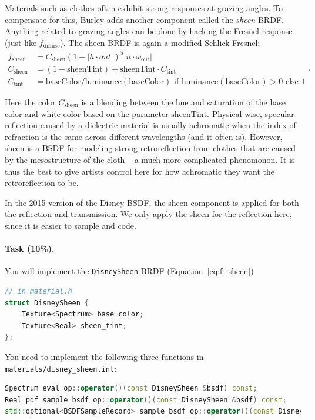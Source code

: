 Materials such as clothes often exhibit strong responses at grazing angles. To compensate for this, Burley adds another component called the \emph{sheen} BRDF. Anything related to grazing angles can be done by hacking the Fresnel response (just like $f_{\text{diffuse}}$). The sheen BRDF is again a modified Schlick Fresnel:
\begin{equation}
\begin{aligned}
f_{\text{sheen}} &= C_{\text{sheen}} (1 - |h \cdot out|)^5 |n \cdot \omega_{\text{out}}| \\
C_{\text{sheen}} &= \left(1 - \text{sheenTint}\right) + \text{sheenTint} \cdot C_{\text{tint}} \\
C_{\text{tint}} &= \text{baseColor} / \text{luminance}(\text{baseColor}) \text{ if } \text{luminance}(\text{baseColor}) > 0 \text{ else } 1
\end{aligned}.
\label{eq:f_sheen}
\end{equation}

Here the color $C_{\text{sheen}}$ is a blending between the hue and saturation of the base color and white color based on the parameter $\text{sheenTint}$. Physical-wise, specular reflection caused by a dielectric material is usually achromatic when the index of refraction is the same across different wavelengths (and it often is). However, sheen is a BSDF for modeling strong retroreflection from clothes that are caused by the mesostructure of the cloth -- a much more complicated phenomonon. It is thus the best to give artists control here for how achromatic they want the retroreflection to be.

In the 2015 version of the Disney BSDF, the sheen component is applied for both the reflection and transmission. We only apply the sheen for the reflection here, since it is easier to sample and code.

\paragraph{Task (10\%).} You will implement the \lstinline{DisneySheen} BRDF (Equation~\ref{eq:f_sheen})
\begin{lstlisting}[language=c++]
// in material.h
struct DisneySheen {
    Texture<Spectrum> base_color;
    Texture<Real> sheen_tint;
};
\end{lstlisting}

You need to implement the following three functions in \lstinline{materials/disney_sheen.inl}:
\begin{lstlisting}[language=c++]
Spectrum eval_op::operator()(const DisneySheen &bsdf) const;
Real pdf_sample_bsdf_op::operator()(const DisneySheen &bsdf) const;
std::optional<BSDFSampleRecord> sample_bsdf_op::operator()(const DisneySheen &bsdf) const;
\end{lstlisting}

